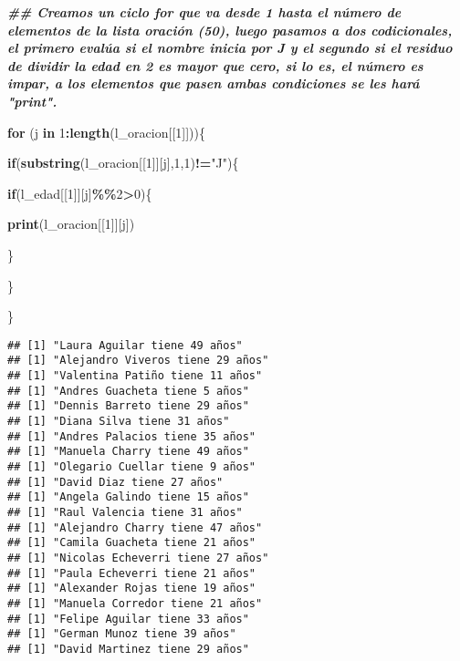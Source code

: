 \documentclass[
]{article}
\newenvironment{Shaded}{\begin{snugshade}}{\end{snugshade}}
\newcommand{\ControlFlowTok}[1]{\textcolor[rgb]{0.13,0.29,0.53}{\textbf{#1}}}
\newcommand{\DecValTok}[1]{\textcolor[rgb]{0.00,0.00,0.81}{#1}}
\newcommand{\DocumentationTok}[1]{\textcolor[rgb]{0.56,0.35,0.01}{\textbf{\textit{#1}}}}
\newcommand{\FunctionTok}[1]{\textcolor[rgb]{0.13,0.29,0.53}{\textbf{#1}}}
\newcommand{\NormalTok}[1]{#1}
\newcommand{\SpecialCharTok}[1]{\textcolor[rgb]{0.81,0.36,0.00}{\textbf{#1}}}
\newcommand{\StringTok}[1]{\textcolor[rgb]{0.31,0.60,0.02}{#1}}
\begin{document}
\begin{Shaded}
\begin{Highlighting}[]
\DocumentationTok{\#\# Creamos un ciclo for que va desde 1 hasta el número de elementos de la lista oración (50), luego pasamos a dos codicionales, el primero evalúa si el nombre inicia por J y el segundo si el residuo de dividir la edad en 2 es mayor que cero, si lo es, el número es impar, a los elementos que pasen ambas condiciones se les hará "print".}

\ControlFlowTok{for}\NormalTok{ (j }\ControlFlowTok{in} \DecValTok{1}\SpecialCharTok{:}\FunctionTok{length}\NormalTok{(l\_oracion[[}\DecValTok{1}\NormalTok{]]))\{}
  
  
  \ControlFlowTok{if}\NormalTok{(}\FunctionTok{substring}\NormalTok{(l\_oracion[[}\DecValTok{1}\NormalTok{]][j],}\DecValTok{1}\NormalTok{,}\DecValTok{1}\NormalTok{)}\SpecialCharTok{!=}\StringTok{"J"}\NormalTok{)\{}
    
    \ControlFlowTok{if}\NormalTok{(l\_edad[[}\DecValTok{1}\NormalTok{]][j]}\SpecialCharTok{\%\%}\DecValTok{2}\SpecialCharTok{\textgreater{}}\DecValTok{0}\NormalTok{)\{}
      
      \FunctionTok{print}\NormalTok{(l\_oracion[[}\DecValTok{1}\NormalTok{]][j])}
      
\NormalTok{    \}}
    
\NormalTok{  \}}

\NormalTok{\}}
\end{Highlighting}
\end{Shaded}

\begin{verbatim}
## [1] "Laura Aguilar tiene 49 años"
## [1] "Alejandro Viveros tiene 29 años"
## [1] "Valentina Patiño tiene 11 años"
## [1] "Andres Guacheta tiene 5 años"
## [1] "Dennis Barreto tiene 29 años"
## [1] "Diana Silva tiene 31 años"
## [1] "Andres Palacios tiene 35 años"
## [1] "Manuela Charry tiene 49 años"
## [1] "Olegario Cuellar tiene 9 años"
## [1] "David Diaz tiene 27 años"
## [1] "Angela Galindo tiene 15 años"
## [1] "Raul Valencia tiene 31 años"
## [1] "Alejandro Charry tiene 47 años"
## [1] "Camila Guacheta tiene 21 años"
## [1] "Nicolas Echeverri tiene 27 años"
## [1] "Paula Echeverri tiene 21 años"
## [1] "Alexander Rojas tiene 19 años"
## [1] "Manuela Corredor tiene 21 años"
## [1] "Felipe Aguilar tiene 33 años"
## [1] "German Munoz tiene 39 años"
## [1] "David Martinez tiene 29 años"
\end{verbatim}
\end{document}
